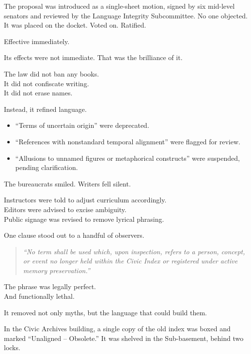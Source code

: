 \documentclass[12pt]{article}
\begin{document}
The proposal was introduced as a single-sheet motion, signed by six mid-level senators and reviewed by the Language Integrity Subcommittee. No one objected. It was placed on the docket. Voted on. Ratified.

Effective immediately.

\vspace{1em}

Its effects were not immediate. That was the brilliance of it.

The law did not ban any books.\\
It did not confiscate writing.\\
It did not erase names.

Instead, it refined language.

\begin{itemize}
    \item “Terms of uncertain origin” were deprecated.
    \item “References with nonstandard temporal alignment” were flagged for review.
    \item “Allusions to unnamed figures or metaphorical constructs” were suspended, pending clarification.
\end{itemize}

The bureaucrats smiled. Writers fell silent.

Instructors were told to adjust curriculum accordingly.\\
Editors were advised to excise ambiguity.\\
Public signage was revised to remove lyrical phrasing.

\vspace{1em}

One clause stood out to a handful of observers.

\begin{quote}
\textit{“No term shall be used which, upon inspection, refers to a person, concept, or event no longer held within the Civic Index or registered under active memory preservation.”}
\end{quote}

The phrase was legally perfect.\\
And functionally lethal.

It removed not only myths, but the language that could build them.

\vspace{1em}

In the Civic Archives building, a single copy of the old index was boxed and marked “Unaligned – Obsolete.” It was shelved in the Sub-basement, behind two locks.
\end{document}
